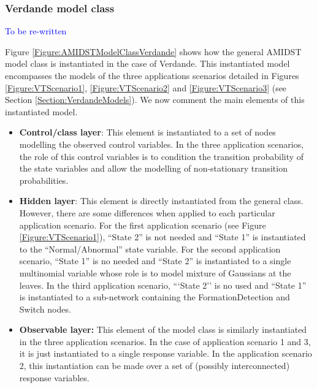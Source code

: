 \subsubsection{Verdande model class}\label{verdandeAMIDSTModels}
\textcolor{blue}{To be re-written}

Figure \ref{Figure:AMIDSTModelClassVerdande} shows how the general AMIDST model class is instantiated in the case of Verdande. This instantiated model encompasses the models of the three applications scenarios detailed in Figures \ref{Figure:VTScenario1}, \ref{Figure:VTScenario2} and \ref{Figure:VTScenario3}  (see Section \ref{Section:VerdandeModels}).  We now comment the main elements of this instantiated model.


\begin{itemize}
\item \textbf{Control/class layer}:  This element is instantiated to a set of nodes modelling the observed control variables. In the three application scenarios, the role of this control variables is to condition the transition probability of the state variables and allow the modelling of non-stationary transition probabilities.  

\item \textbf{Hidden layer}: This element is directly instantiated from the general class. However, there are some differences when applied to each particular application scenario. For the first application scenario (see Figure \ref{Figure:VTScenario1}),  ``State 2'' is not needed and ``State 1'' is instantiated to the ``Normal/Abnormal'' state variable. For the second application scenario, ``State 1'' is no needed and ``State 2'' is instantiated to a single multinomial variable whose role is to model mixture of Gaussians at the leaves. In the third application scenario, ```State 2'' is no used and ``State 1'' is instantiated to a sub-network containing the FormationDetection and Switch nodes. 

\item \textbf{Observable layer: } This element of the model class is similarly instantiated in the three application scenarios. In the case of application scenario 1 and 3, it is just instantiated to a single response variable. In the application scenario 2, this instantiation can be made over a set of (possibly interconnected) response variables. 
\end{itemize}




